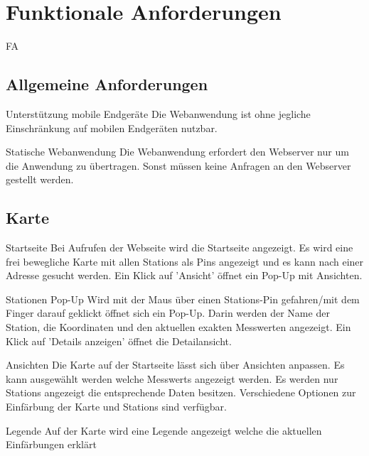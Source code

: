 \section{Funktionale Anforderungen}

\setcounter{counter}{10}
\begin{Kriterien}{FA}

\subsection{Allgemeine Anforderungen}

 \item[Unterstützung mobile Endgeräte]
   Die \gls{Webanwendung} ist ohne jegliche Einschränkung auf mobilen Endgeräten nutzbar.  

 \item[Statische Webanwendung]
   Die \gls{Webanwendung} erfordert den \gls{Webserver} nur um die Anwendung zu übertragen.
   Sonst müssen keine Anfragen an den \gls{Webserver} gestellt werden. 

\subsection{Karte}

 \item[Startseite]
   Bei Aufrufen der Webseite wird die Startseite angezeigt.
   Es wird eine frei bewegliche Karte mit allen \glspl{Station} als \glspl{Pin} angezeigt und es kann nach einer Adresse gesucht werden.
   Ein Klick auf 'Ansicht' öffnet ein \gls{Pop-Up} mit Ansichten.

 \item[Stationen Pop-Up]
  Wird mit der Maus über einen Stations-\gls{Pin} gefahren/mit dem Finger darauf geklickt öffnet sich ein \gls{Pop-Up}.
  Darin werden der Name der \gls{Station}, die Koordinaten und den aktuellen exakten Messwerten angezeigt.
  Ein Klick auf 'Details anzeigen' öffnet die Detailansicht.

 \item[Ansichten]
   Die Karte auf der Startseite lässt sich über Ansichten anpassen.
   Es kann ausgewählt werden welche \glspl{Messwert} angezeigt werden.
   Es werden nur \glspl{Station} angezeigt die entsprechende Daten besitzen.
   Verschiedene Optionen zur Einfärbung der Karte und \glspl{Station} sind verfügbar.

 \item[Legende]
  Auf der Karte wird eine Legende angezeigt welche die aktuellen Einfärbungen erklärt  


\end{Kriterien}
